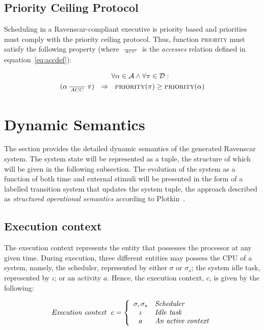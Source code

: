 \subsection{Priority Ceiling Protocol}
Scheduling in a Ravenscar-compliant executive is priority based and
priorities must comply with the priority ceiling protocol. Thus,
function {\scshape priority} must satisfy the following property
(where $\,\frac{}{\,^{{ACC}}\,}\,$ is the \emph{accesses} relation defined in
equation~\ref{eq:accdef}):

\begin{eqnarray}
  \forall \alpha \in {\cal A} \wedge \forall \pi \in {\cal D}:\ \ \ \ \ \ \ \ \ \ \ \ \ \ \ 
  \nonumber \\
  (\alpha \RL{ACC} \pi) \ \ 
  \Rightarrow \ \  \text{\scshape priority}(\pi) \geq \text{\scshape priority}(\alpha)
\end{eqnarray}

\section{Dynamic Semantics}
\label{sec:dynamic_semantics}
The section provides the detailed dynamic semantics of the generated
Ravenscar system. The system state will be represented as a tuple,
the structure of which will be given in the following subsection. The
evolution of the system as a function of both time and external
stimuli will be presented in the form of a labelled transition system
that updates the system tuple, the approach described as
\emph{structured operational semantics} according to
Plotkin~\cite{plotkin-sos}.

\subsection{Execution context}
The execution context represents the entity that possesses the
processor at any given time. During execution, three different
entities may possess the CPU of a system, namely, the scheduler,
represented by either $\sigma$ or $\sigma_s$; the system idle task,
represented by $\iota$; or an activity $a$. Hence, the execution
context, $c$, is given by the following:

\begin{displaymath} 
\centering
\textit{Execution context} \ \ c = 
  \left\{ \begin{array}{cl}
    \sigma,\sigma_s & \textit{Scheduler}\\
    \iota & \textit{Idle task}\\
    a & \textit{An active context}
  \end{array}
  \right.
\end{displaymath}

